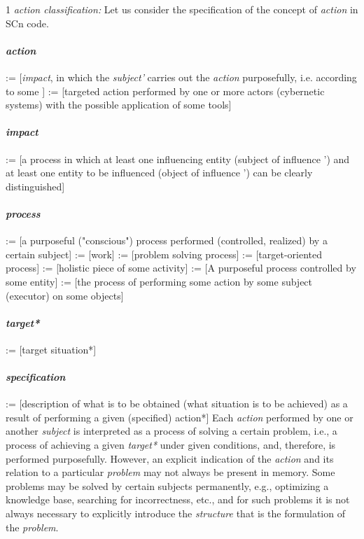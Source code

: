 \documentclass[a4paper, 10pt,]{article}
\begin{document}
1 \textit{action classification:} Let us consider the specification of the concept of \textit{action} in SCn code.
\paragraph{\textit{action}} 

\hfill\break:= [\textit{impact}, in which the \textit{subject'} carries out the \textit{action}
purposefully, i.e. according to some ]
\hfill\break:= [targeted action performed by one or more actors
(cybernetic systems) with the possible application
of some tools]
\paragraph{\subset \textit{impact}}
\hfill\break:= [a process in which at least one influencing entity
(subject of influence ') and at least one entity
to be influenced (object of influence ') can be
clearly distinguished]
\paragraph{\subset \textit{process}}
\hfill\break:= [a purposeful ("conscious") process performed (controlled, realized) by a certain subject]
\hfill\break:= [work]
\hfill\break:= [problem solving process]
\hfill\break:= [target-oriented process]
\hfill\break:= [holistic piece of some activity]
\hfill\break:= [A purposeful process controlled by some entity]
\hfill\break:= [the process of performing some action by some
subject (executor) on some objects]
\paragraph{\textbf{\textit{target*}}}
\hfill\break:= [target situation*]

\paragraph{\subset \textit{specification}}
\hfill\break:= [description of what is to be obtained (what situation
is to be achieved) as a result of performing a given
(specified) action*]
Each \textit{action} performed by one or another \textit{subject} is
interpreted as a process of solving a certain problem,
i.e., a process of achieving a given \textit{target*} under given
conditions, and, therefore, is performed purposefully.
However, an explicit indication of the \textit{action} and its relation to a particular \textit{problem} may not always be present
in memory. Some problems may be solved by certain
subjects permanently, e.g., optimizing a knowledge base,
searching for incorrectness, etc., and for such problems
it is not always necessary to explicitly introduce the
\textit{structure} that is the formulation of the \textit{problem}.
\end{document}
